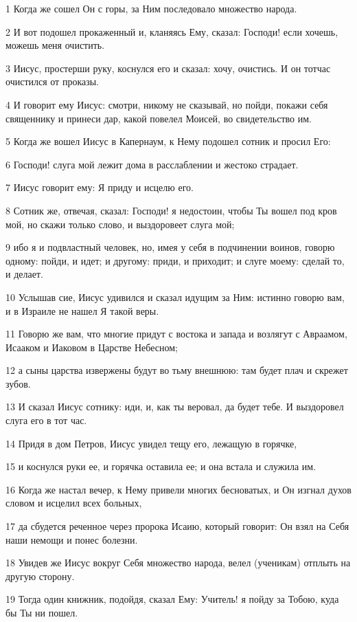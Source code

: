 \par 1 Когда же сошел Он с горы, за Ним последовало множество народа.
\par 2 И вот подошел прокаженный и, кланяясь Ему, сказал: Господи! если хочешь, можешь меня очистить.
\par 3 Иисус, простерши руку, коснулся его и сказал: хочу, очистись. И он тотчас очистился от проказы.
\par 4 И говорит ему Иисус: смотри, никому не сказывай, но пойди, покажи себя священнику и принеси дар, какой повелел Моисей, во свидетельство им.
\par 5 Когда же вошел Иисус в Капернаум, к Нему подошел сотник и просил Его:
\par 6 Господи! слуга мой лежит дома в расслаблении и жестоко страдает.
\par 7 Иисус говорит ему: Я приду и исцелю его.
\par 8 Сотник же, отвечая, сказал: Господи! я недостоин, чтобы Ты вошел под кров мой, но скажи только слово, и выздоровеет слуга мой;
\par 9 ибо я и подвластный человек, но, имея у себя в подчинении воинов, говорю одному: пойди, и идет; и другому: приди, и приходит; и слуге моему: сделай то, и делает.
\par 10 Услышав сие, Иисус удивился и сказал идущим за Ним: истинно говорю вам, и в Израиле не нашел Я такой веры.
\par 11 Говорю же вам, что многие придут с востока и запада и возлягут с Авраамом, Исааком и Иаковом в Царстве Небесном;
\par 12 а сыны царства извержены будут во тьму внешнюю: там будет плач и скрежет зубов.
\par 13 И сказал Иисус сотнику: иди, и, как ты веровал, да будет тебе. И выздоровел слуга его в тот час.
\par 14 Придя в дом Петров, Иисус увидел тещу его, лежащую в горячке,
\par 15 и коснулся руки ее, и горячка оставила ее; и она встала и служила им.
\par 16 Когда же настал вечер, к Нему привели многих бесноватых, и Он изгнал духов словом и исцелил всех больных,
\par 17 да сбудется реченное через пророка Исаию, который говорит: Он взял на Себя наши немощи и понес болезни.
\par 18 Увидев же Иисус вокруг Себя множество народа, велел (ученикам) отплыть на другую сторону.
\par 19 Тогда один книжник, подойдя, сказал Ему: Учитель! я пойду за Тобою, куда бы Ты ни пошел.
